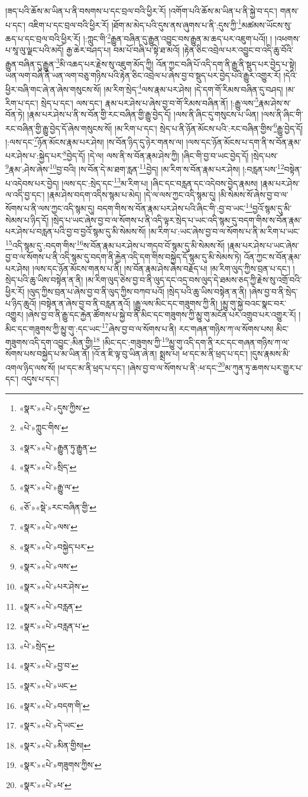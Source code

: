 །ཟད་པའི་ཆོས་མ་ཡིན་པ་ནི་བསགས་པ་དང་བྲལ་བའི་ཕྱིར་རོ། །འགོག་པའི་ཆོས་མ་ཡིན་པ་ནི་སྐྱེ་བ་དང་། གནས་པ་དང་། འཇིག་པ་དང་བྲལ་བའི་ཕྱིར་རོ། །ཐོག་མ་མེད་པའི་དུས་ནས་ཞུགས་པ་ནི་:དུས་ཀྱི་\footnote{«སྣར་»«པེ་»དུས་ཀྱིས་}མཚམས་ཡོངས་སུ་ཆད་པ་དང་བྲལ་བའི་ཕྱིར་རོ། །:ཀླུང་གི་\footnote{«པེ་»ཀླུང་གིས་}རྒྱུན་བཞིན་དུ་རྒྱུན་འབྱུང་བས་རྒྱུན་མ་ཆད་པར་འཇུག་པའོ།། །
།འཕགས་པ་སཱ་ལུ་ལྗང་པའི་མདོ། རྒྱ་ཆེར་བཤད་པ། བམ་པོ་བཞི་པ་སྟེ་ཐ་མའོ། །རྟེན་ཅིང་འབྲེལ་པར་འབྱུང་བ་འདི་ཆུ་བོའི་རྒྱུན་བཞིན་དུ་རྒྱུན་\footnote{«སྣར་»«པེ་»རྒྱུན་ཏུ་རྒྱུན་}མི་འཆད་པར་རྗེས་སུ་འཇུག་མོད་ཀྱི། འོན་ཀྱང་བཞི་པོ་འདི་དག་ནི་རྒྱུ་ནི་སྡུད་པར་བྱེད་པ་སྟེ། ཡན་ལག་བཞི་ནི་ཡན་ལག་བཅུ་གཉིས་པའི་རྟེན་ཅིང་འབྲེལ་པ་ཞེས་བྱ་བ་སྡུད་པར་བྱེད་པའི་རྒྱུར་འགྱུར་རོ། །དེའི་ཕྱིར་བཞི་གང་ཞེ་ན་ཞེས་གསུངས་སོ། །མ་རིག་སྲེད་\footnote{«སྣར་»«པེ་»སྲིད་}ལས་རྣམ་པར་ཤེས། །དེ་དག་གོ་རིམས་བཞིན་དུ་བཤད། །མ་རིག་པ་དང་། སྲེད་པ་དང་། ལས་དང་། རྣམ་པར་ཤེས་པ་ཞེས་བྱ་བ་གོ་རིམས་བཞིན་ནོ། །:རྒྱུ་ལས་\footnote{«སྣར་»«པེ་»རྒྱུ་ལ་}རྣམ་ཤེས་ས་བོན་ཏེ། །རྣམ་པར་ཤེས་པ་ནི་ས་བོན་གྱི་རང་བཞིན་གྱི་རྒྱུ་བྱེད་དོ། །ལས་ནི་ཞིང་དུ་གསུངས་པ་ཡིན། །ལས་ནི་ཞིང་གི་རང་བཞིན་གྱི་རྒྱུ་བྱེད་དོ་ཞེས་གསུངས་སོ། །མ་རིག་པ་དང་། སྲེད་པ་ནི་ཉོན་མོངས་པའི་:རང་བཞིན་གྱིས་\footnote{«ཅོ་»«སྡེ་»རང་བཞིན་གྱི་}རྒྱུ་བྱེད་དོ། །:ལས་དང་\footnote{«སྣར་»«པེ་»ལས་}ཉོན་མོངས་རྣམ་པར་ཤེས། །ས་བོན་ཉིད་དུ་ཉེར་གནས་ལ། །ལས་དང་ཉོན་མོངས་པ་དག་ནི་ས་བོན་རྣམ་པར་ཤེས་པ་:སྐྱེད་པར་\footnote{«སྣར་»«པེ་»བསྐྱེད་པར་}བྱེད་དོ། །དེ་ལ། ལས་ནི་ས་བོན་རྣམ་ཤེས་ཀྱི། །ཞིང་གི་བྱ་བ་ཡང་བྱེད་དོ། །སྲེད་པས་\footnote{«སྣར་»«པེ་»ལས་}རྣམ་:ཤེས་ཞེས་\footnote{«སྣར་»«པེ་»པར་ཤེས་}བྱ་བའི། །ས་བོན་དེ་མ་ཐག་རླན་\footnote{«སྣར་»«པེ་»བརླན་}བྱེད། །མ་རིག་ས་བོན་རྣམ་པར་ཤེས། །:བརླན་པས་\footnote{«སྣར་»«པེ་»བརླན་པ་}བསྟེན་པ་འདེབས་པར་བྱེད། །ལས་དང་:སྲེད་དང་\footnote{«པེ་»སྲེད་}མ་རིག་པ། །ཞིང་དང་བརླན་དང་འདེབས་བྱེད་རྣམས། །རྣམ་པར་ཤེས་ལ་འདི་བྱ་དང་། །རྣམ་ཤེས་བདག་འདིས་སྙམ་པ་མེད། །དེ་ལ་ལས་ཀྱང་འདི་སྙམ་དུ། །མི་སེམས་སོ་ཞེས་བྱ་བ་ལ་སོགས་པ་ནི་ལས་ཀྱང་འདི་སྙམ་དུ། བདག་གིས་ས་བོན་རྣམ་པར་ཤེས་པའི་ཞིང་གི་:བྱ་བ་ཡང་\footnote{«སྣར་»«པེ་»བྱ་བ་}བྱའོ་སྙམ་དུ་མི་སེམས་པ་ཉིད་དོ། །སྲེད་པ་ཡང་ཞེས་བྱ་བ་ལ་སོགས་པ་ནི་འདི་ལྟར་སྲེད་པ་ཡང་འདི་སྙམ་དུ་བདག་གིས་ས་བོན་རྣམ་པར་ཤེས་པ་བརླན་པའི་བྱ་བ་བྱའོ་སྙམ་དུ་མི་སེམས་སོ། །མ་རིག་པ་:ཡང་ཞེས་བྱ་བ་ལ་སོགས་པ་ནི་མ་རིག་པ་ཡང་\footnote{«སྣར་»«པེ་»ཡང་}འདི་སྙམ་དུ་:བདག་གིས་\footnote{«སྣར་»«པེ་»བདག་གི་}ས་བོན་རྣམ་པར་ཤེས་པ་གདབ་བོ་སྙམ་དུ་མི་སེམས་སོ། །རྣམ་པར་ཤེས་པ་ཡང་ཞེས་བྱ་བ་ལ་སོགས་པ་ནི་འདི་སྙམ་དུ་བདག་ནི་རྐྱེན་འདི་དག་གིས་བསྐྱེད་དོ་སྙམ་དུ་མི་སེམས་ཏེ། འོན་ཀྱང་ས་བོན་རྣམ་པར་ཤེས། །ལས་དང་ཉོན་མོངས་གནས་པ་ནི། །ས་བོན་རྣམ་ཤེས་ཞེས་བརྗོད་པ། །མ་རིག་ལུད་ཀྱིས་བྲན་པ་དང་། །སྲེད་པའི་ཆུ་ཡིས་བསྟེན་ན་ནི། །མ་རིག་ལུད་ཅེས་བྱ་བ་ནི་ལུད་དང་འདྲ་བས་ལུད་དེ་ཐམས་ཅད་ཀྱི་རྗེས་སུ་འགྲོ་བའི་ཕྱིར་རོ། །ལུད་ཀྱིས་བྲན་པ་ཞེས་བྱ་བ་ནི་ལུད་ཀྱིས་བཀབ་པའོ། །སྲེད་པའི་ཆུ་ཡིས་བསྟེན་ན་ནི། །ཞེས་བྱ་བ་ནི་སྲེད་པ་ཉིད་ཆུའོ། །བསྟེན་ན་ཞེས་བྱ་བ་ནི་བརླན་ནའོ། །རྒྱུ་ལས་མིང་དང་གཟུགས་ཀྱི་ནི། །མྱུ་གུ་སྐྱེ་བའང་སྣང་བར་འགྱུར། །ཞེས་བྱ་བ་ནི་རྒྱུ་དང་རྐྱེན་ཚོགས་པ་སྐྱེ་བ་ནི་མིང་དང་གཟུགས་ཀྱི་མྱུ་གུ་མངོན་པར་འགྲུབ་པར་འགྱུར་རོ། །མིང་དང་གཟུགས་ཀྱི་མྱུ་གུ་:དང་ཡང་\footnote{«སྣར་»«པེ་»དེ་ཡང་}ཞེས་བྱ་བ་ལ་སོགས་པ་ནི། རང་གཞན་གཉིས་ཀ་ལ་སོགས་པས། མིང་གཟུགས་འདི་དག་འབྱུང་:མིན་གྱི།\footnote{«སྣར་»«པེ་»མིན་གྱིས།} །མིང་དང་:གཟུགས་ཀྱི་\footnote{«སྣར་»«པེ་»གཟུགས་ཀྱིས་}མྱུ་གུ་འདི་དག་ནི་རང་དང་གཞན་གཉིས་ཀ་ལ་སོགས་པས་བསྐྱེད་པ་མ་ཡིན་ནོ། །འོ་ན་ཇི་ལྟ་བུ་ཡིན་ཞེ་ན། སྨྲས་པ། ཕ་དང་མ་ནི་ཕྲད་པ་དང་། །དུས་རྣམས་མི་འགལ་ཉིད་ལས་སོ། །ཕ་དང་མ་ནི་ཕྲད་པ་དང་། །ཞེས་བྱ་བ་ལ་སོགས་པ་ནི་:ཕ་དང་\footnote{«སྣར་»«པེ་»ཕ་}མ་ཀུན་ཏུ་ཆགས་པར་གྱུར་པ་དང་། འདུས་པ་དང་། 